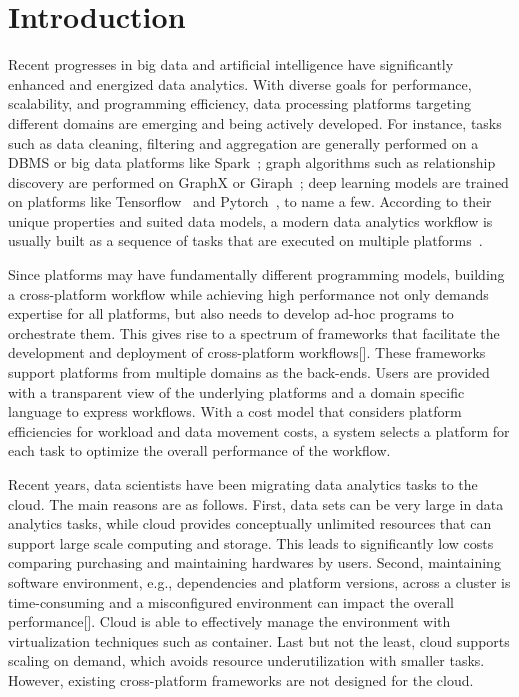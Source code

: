 \section{Introduction}

Recent progresses in big data and artificial intelligence have significantly enhanced and energized data analytics.  With diverse goals for performance, scalability, and programming efficiency, data processing platforms targeting different domains are emerging and being actively developed. For instance, tasks such as data cleaning, filtering and aggregation are generally
performed on a DBMS or big data platforms like Spark~\cite{}; graph algorithms such as relationship discovery are performed on GraphX or Giraph~\cite{}; deep learning models are trained on platforms like Tensorflow~\cite{} and Pytorch~\cite{}, to name a few.
According to their unique properties and suited data models, a modern data analytics workflow is usually built as a sequence of tasks that are executed on multiple platforms~\cite{}. 

Since platforms may have fundamentally different programming
models, building a cross-platform workflow while achieving 
high performance not only demands expertise for all platforms, but also needs to develop ad-hoc programs to orchestrate them. 
This gives rise to a spectrum of frameworks that facilitate the development and deployment of cross-platform workflows[]. 
These frameworks support platforms from multiple domains as the back-ends. Users are provided with a transparent view of the underlying platforms and a domain specific language to express workflows. 
With a cost model that considers platform efficiencies for workload and data movement costs, a system selects a platform for each task to optimize the overall performance of the workflow.

Recent years, data scientists have been migrating data analytics tasks to the cloud. The main reasons are as follows. First, data sets can be very large in data analytics tasks, while cloud provides conceptually unlimited resources that can support large scale computing and storage. This leads to significantly low costs comparing purchasing and maintaining hardwares by users. Second, maintaining software environment, e.g., dependencies and platform versions, across a cluster is time-consuming and a misconfigured environment can impact the overall performance[]. Cloud is able to effectively manage the environment with virtualization techniques such as container. Last but not the least, cloud supports scaling on demand, which avoids resource underutilization with smaller tasks. However, existing cross-platform frameworks are not designed for the cloud.

